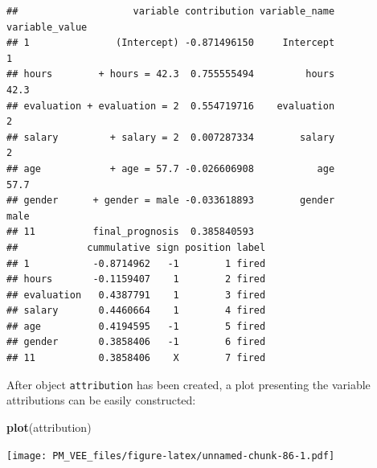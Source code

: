 \documentclass[12pt,]{krantz}
\newenvironment{Shaded}{\begin{snugshade}}{\end{snugshade}}
\newcommand{\KeywordTok}[1]{\textcolor[rgb]{0.13,0.29,0.53}{\textbf{#1}}}
\newcommand{\NormalTok}[1]{#1}
\theoremstyle{definition}
\theoremstyle{definition}
\theoremstyle{definition}
\theoremstyle{remark}
\begin{document}
\begin{verbatim}
##                    variable contribution variable_name variable_value
## 1               (Intercept) -0.871496150     Intercept              1
## hours        + hours = 42.3  0.755555494         hours           42.3
## evaluation + evaluation = 2  0.554719716    evaluation              2
## salary         + salary = 2  0.007287334        salary              2
## age            + age = 57.7 -0.026606908           age           57.7
## gender      + gender = male -0.033618893        gender           male
## 11          final_prognosis  0.385840593                             
##            cummulative sign position label
## 1           -0.8714962   -1        1 fired
## hours       -0.1159407    1        2 fired
## evaluation   0.4387791    1        3 fired
## salary       0.4460664    1        4 fired
## age          0.4194595   -1        5 fired
## gender       0.3858406   -1        6 fired
## 11           0.3858406    X        7 fired
\end{verbatim}

After object \texttt{attribution} has been created, a plot presenting
the variable attributions can be easily constructed:

\begin{Shaded}
\begin{Highlighting}[]
\KeywordTok{plot}\NormalTok{(attribution)}
\end{Highlighting}
\end{Shaded}

\texttt{[image: PM\_VEE\_files/figure-latex/unnamed-chunk-86-1.pdf]}


\end{document}
